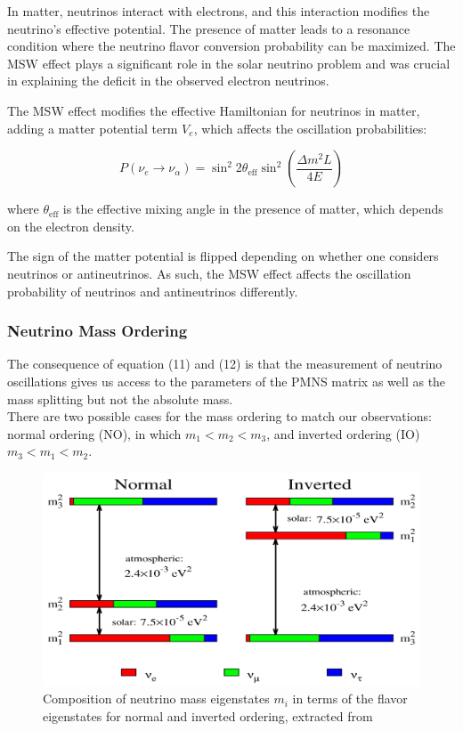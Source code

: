 \documentclass[a4paper,12pt,numbered]{article}
\begin{document}
In matter, neutrinos interact with electrons, and this interaction modifies the neutrino's effective potential. The presence of matter leads to a resonance condition where the neutrino flavor conversion probability can be maximized. The MSW effect plays a significant role in the solar neutrino problem and was crucial in explaining the deficit in the observed electron neutrinos.

The MSW effect modifies the effective Hamiltonian for neutrinos in matter, adding a matter potential term \( V_e \), which affects the oscillation probabilities:

\[
P(\nu_e \to \nu_\alpha) = \sin^2 2\theta_{\text{eff}} \sin^2 \left(\frac{\Delta m^2 L}{4E}\right)
\]

where \( \theta_{\text{eff}} \) is the effective mixing angle in the presence of matter, which depends on the electron density.

The sign of the matter potential is flipped depending on whether one considers neutrinos or antineutrinos. As such, the MSW effect affects the oscillation probability of neutrinos and antineutrinos differently.


\subsubsection{Neutrino Mass Ordering}

The consequence of equation (11) and (12) is that the measurement of neutrino oscillations gives us access to the parameters of the PMNS matrix as well as the mass splitting but not the absolute mass.
\\ 
There are two possible cases for the mass ordering to match our observations: normal ordering (NO), in which $m_1 < m_2 < m_3$, and inverted ordering (IO) $m_3 < m_1 < m_2$. 

\begin{figure}[H]
\includegraphics[width=\textwidth]{Neutrino_Figures/nmo.png}
\caption{Composition of neutrino mass eigenstates $m_i$ in terms of the flavor eigenstates for normal and inverted ordering, extracted from \cite{nmo_image_source}}
\end{figure}
\end{document}
